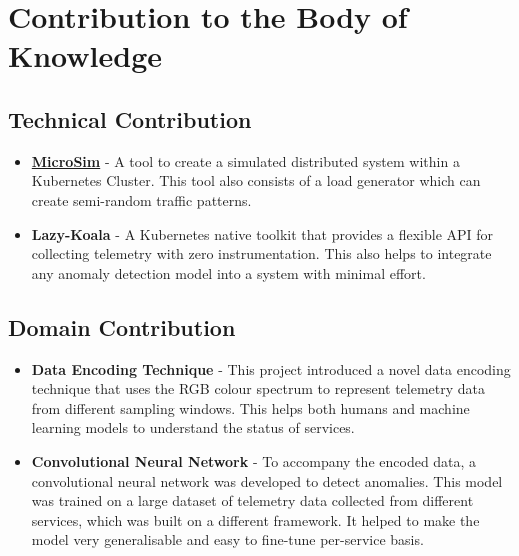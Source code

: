 \section{Contribution to the Body of Knowledge}

\subsection{Technical Contribution}

\begin{itemize}[noitemsep,nolistsep]
    \item \textbf{\href{https://github.com/MrSupiri/MicroSim}{MicroSim}} - A tool to create a simulated distributed system within a Kubernetes Cluster. This tool also consists of a load generator which can create semi-random traffic patterns.
    \item \textbf{Lazy-Koala} - A Kubernetes native toolkit that provides a flexible API for collecting telemetry with zero instrumentation. This also helps to integrate any anomaly detection model into a system with minimal effort.
\end{itemize} 

\subsection{Domain Contribution}

\begin{itemize}[noitemsep,nolistsep]
    \item \textbf{Data Encoding Technique} - This project introduced a novel data encoding technique that uses the RGB colour spectrum to represent telemetry data from different sampling windows. This helps both humans and machine learning models to understand the status of services.
    \item \textbf{Convolutional Neural Network} - To accompany the encoded data, a convolutional neural network was developed to detect anomalies. This model was trained on a large dataset of telemetry data collected from different services, which was built on a different framework. It helped to make the model very generalisable and easy to fine-tune per-service basis.
\end{itemize} 